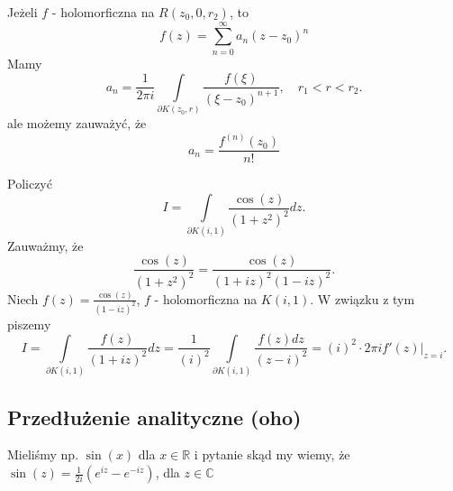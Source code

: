 \documentclass[../main.tex]{subfiles}
\begin{document}
Jeżeli $f$ - holomorficzna na $R(z_0, 0, r_2)$, to
\[
    f(z) = \sum_{n = 0}^{\infty} a_n (z-z_0)^n
\]
Mamy
\[
    a_n = \frac{1}{2 \pi i} \int\limits_{\partial K(z_0, r)} \frac{f(\xi)}{(\xi - z_0)^{n+1}},\quad r_1 < r < r_2
.\]
ale możemy zauważyć, że
\[
    a_n = \frac{f^{(n)}(z_0)}{n!}
\]
\begin{przyklad}
    Policzyć
    \[
        I = \int\limits_{\partial K(i, 1)} \frac{\cos (z)}{(1+z^2)^2} dz
    .\]
Zauważmy, że
    \[
        \frac{\cos(z)}{(1+z^2)^2} = \frac{\cos(z)}{(1+iz)^2(1-iz)^2}
    .\]
    Niech $f(z) = \frac{\cos(z)}{(1 - iz)^2}$, $f$ - holomorficzna na $K(i,1)$. W związku z tym piszemy
    \[
        I = \int\limits_{\partial K(i,1)} \frac{f(z)}{(1+iz)^2}dz = \frac{1}{(i)^2} \int\limits_{\partial K(i,1)} \frac{f(z) dz}{(z-i)^2} = (i)^2 \cdot 2\pi i \left. f'(z) \right|_{z = i}
    .\]
\end{przyklad}

\pagebreak
\subsection{Przedłużenie analityczne (oho)}
Mieliśmy np. $\sin(x)$ dla $x\in \mathbb{R}$ i pytanie skąd my wiemy, że $\sin(z) = \frac{1}{2i} \left(e^{iz} - e^{-iz}\right)$, dla $z \in \mathbb{C}$
\end{document}
